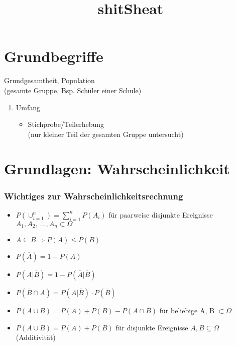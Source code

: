 \documentclass[10pt,a4paper,landscape]{article}
\title{shitSheat}
\newcommand{\setdocumentfont}{\fontsize{6}{8}\selectfont}
\begin{document}
\setdocumentfont
\begin{multicols}{4}
\noindent

\section{Grundbegriffe}
Grundgesamtheit, Population\\
	(gesamte Gruppe, Bsp. Schüler einer Schule)

\begin{enumerate}

\item Umfang
\begin{itemize}
\item Stichprobe/Teilerhebung\\
	(nur kleiner Teil der gesamten Gruppe untersucht)
\end{itemize}

\end{enumerate}


\section{Grundlagen: Wahrscheinlichkeit}

\subsubsection*{Wichtiges zur Wahrscheinlichkeitsrechnung}
\begin{itemize}
\item $P(\cup _{i=1} ^{n}) = \sum_{i=1}^n P(A_i)$ für paarweise disjunkte Ereignisse $A_1, A_2, ~..., A_n \subset \Omega$
\item $A \subseteq B \Rightarrow P(A) \leqslant P(B)$
\item \(P (\overline{A}) = 1 - P(A)\)
\item $P(A|\overline{B})= 1 - P(\overline{A} |\overline{B})$
\item $P(\overline{B}\cap A)=P(A|\overline{B})\cdot P(\overline{B})$
\item $P(A\cup B) = P(A) + P(B) -P(A\cap B)$ für beliebige A, B $\subset \Omega$
\item $P(A \cup B) = P(A) + P(B)$ für disjunkte Ereignisse $A,B \subseteq \Omega$ (Additivität)
\end{itemize}


\end{multicols}
\end{document}
